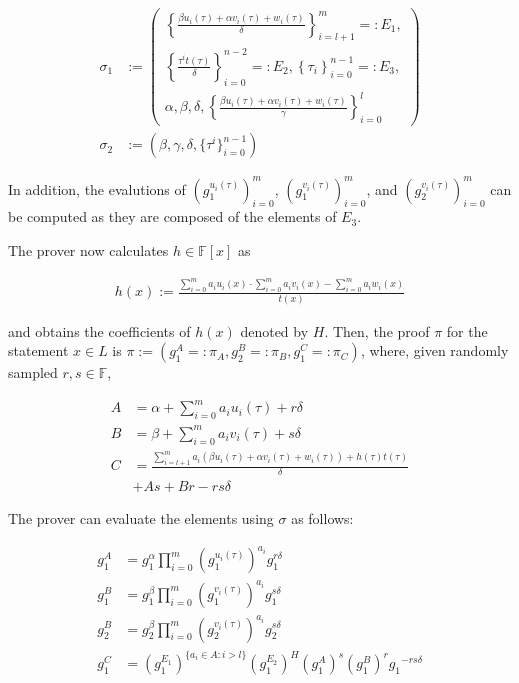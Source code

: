 \documentclass{article}
\begin{document}
\begin{adjustbox}{max width=.5\textwidth}
\parbox{\linewidth}{
\begin{align*}
        \sigma_1 &:= \left(\begin{aligned}\left\{\frac{\beta u_i(\tau) + \alpha v_i(\tau) + w_i(\tau)}{\delta}\right\}_{i=l+1}^m =: E_1,\\
        \left\{\frac{\tau^i t(\tau)}{\delta}\right\}_{i=0}^{n-2} =: E_2, \left\{\tau_i\right\}_{i=0}^{n-1} =: E_3,\\
        \alpha, \beta, \delta, \left\{\frac{\beta u_i(\tau) + \alpha v_i(\tau) + w_i(\tau)}{\gamma}\right\}_{i=0}^l\end{aligned}\right) \\
        \sigma_2 &:= \left(\beta, \gamma, \delta, \{\tau^i\}_{i=0}^{n-1}\right)
\end{align*}}
\end{adjustbox}

In addition, the evalutions of $(g_1^{u_i(\tau)})_{i=0}^m$, $(g_1^{v_i(\tau)})_{i=0}^m$, and $(g_2^{v_i(\tau)})_{i=0}^m$ can be computed as they are composed of the elements of $E_3$.

The prover now calculates $h \in \mathbb{F}[x]$ as

\begin{align}h(x) := \frac{\sum_{i=0}^m a_iu_i(x) \cdot \sum_{i=0}^m a_iv_i(x) - \sum_{i=0}^{m} a_iw_i(x)}{t(x)} \label{eq:h}\end{align}

and obtains the coefficients of $h(x)$ denoted by $H$.
Then, the proof $\pi$ for the statement $x \in L$ is $\pi := (g_1^A =: \pi_A, g_2^B =: \pi_B, g_1^C =: \pi_C)$, where, given randomly sampled $r,s\in \mathbb{F}$,

\begin{align}
        A &= \alpha + \sum_{i=0}^m a_iu_i(\tau) + r\delta \label{eq:A} \\
        B &= \beta + \sum_{i=0}^m a_iv_i(\tau) + s\delta \label{eq:B} \\
        C &= \frac{\sum_{i=l+1}^m a_i(\beta u_i(\tau) + \alpha v_i(\tau) + w_i(\tau)) + h(\tau)t(\tau)}{\delta} \label{eq:C} \\
        & + As + Br - rs\delta \nonumber
\end{align}

The prover can evaluate the elements using $\sigma$ as follows:

\begin{align}
        g_1^A &= g_1^\alpha \prod_{i=0}^m {(g_1^{u_i(\tau)})}^{a_i} g_1^{r\delta} \label{eq:gA} \\
        g_1^B &= g_1^\beta \prod_{i=0}^m {(g_1^{v_i(\tau)})}^{a_i} g_1^{s\delta} \label{eq:g1B} \\
        g_2^B &= g_2^\beta \prod_{i=0}^m {(g_2^{v_i(\tau)})}^{a_i} g_2^{s\delta} \label{eq:g2B} \\
        g_1^C &= {(g_1^{E_1})}^{\{a_i \in A \colon i > l\}} {(g_1^{E_2})}^H {(g_1^A)}^s {(g_1^B)}^r {g_1}^{-rs\delta} \label{eq:gC} 
\end{align}
\end{document}
